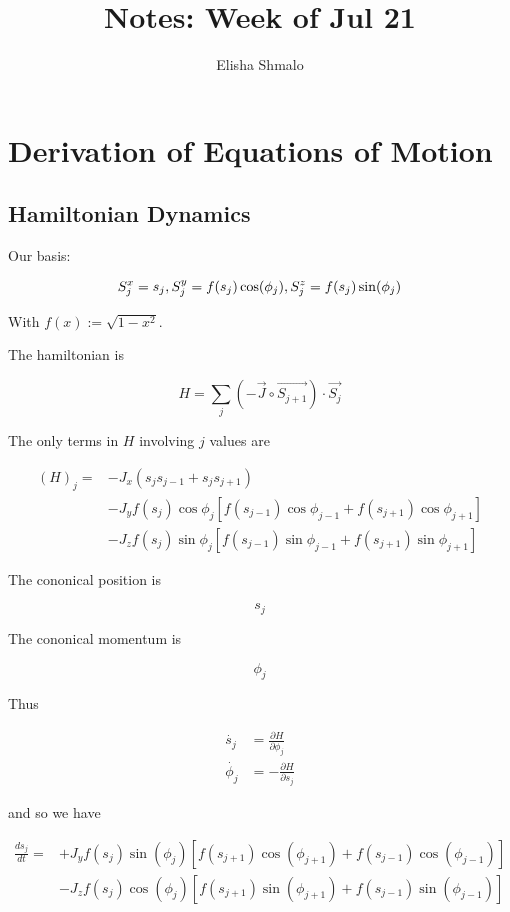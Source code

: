 \documentclass{article}
\author{Elisha Shmalo}
\title{Notes: Week of Jul 21}
\begin{document}
\maketitle

\section{Derivation of Equations of Motion}

\subsection{Hamiltonian Dynamics}

Our basis:

\[
S_j^x = s_j, \space S_j^y = f(s_j)\cos(\phi_j), \space S_j^z = f(s_j)\sin(\phi_j)
\]

With $f(x) := \sqrt{1 - x^2}$.

The hamiltonian is

\[
H = \sum_j (-\vec{J} \circ \vec{S_{j+1}}) \cdot \vec{S_j}
\]

The only terms in $H$ involving $j$ values are

\begin{align*}
    (H)_j = &-J_x(s_js_{j-1} + s_js_{j+1}) \\
            &-J_yf(s_j)\cos\phi_j[f(s_{j-1})\cos\phi_{j-1} + f(s_{j+1})\cos\phi_{j+1}] \\
            &-J_zf(s_j)\sin\phi_j[f(s_{j-1})\sin\phi_{j-1} + f(s_{j+1})\sin\phi_{j+1}]
\end{align*}

The cononical position is

\[s_j\]

The cononical momentum is

\[\phi_j\]

Thus

\begin{align*}
    \dot{s_j} &= \frac{\partial H}{\partial \phi_j}\\
    \dot{\phi_j} &= -\frac{\partial H}{\partial s_j}
\end{align*}

and so we have

\begin{align*}
    \frac{ds_j}{dt} = &+J_yf(s_j)\sin(\phi_j)[f(s_{j+1})\cos(\phi_{j+1}) + f(s_{j-1})\cos(\phi_{j-1})] \\
                      &-J_zf(s_j)\cos(\phi_j)[f(s_{j+1})\sin(\phi_{j+1}) + f(s_{j-1})\sin(\phi_{j-1})]
\end{align*}
\end{document}
